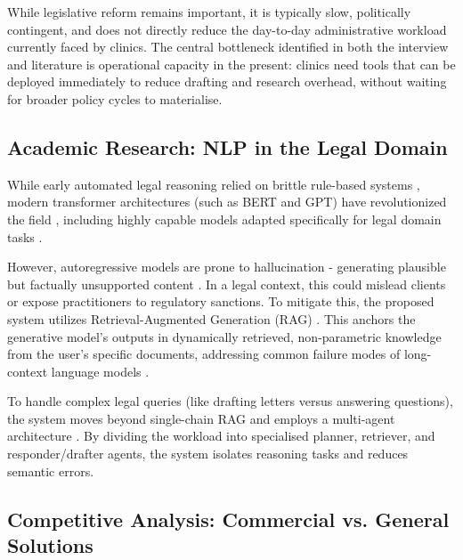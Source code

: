 \documentclass[11pt,a4paper]{article}
\begin{document}
While legislative reform remains important, it is typically slow, politically contingent, and does not directly reduce the day-to-day administrative workload currently faced by clinics. The central bottleneck identified in both the interview and literature is operational capacity in the present: clinics need tools that can be deployed immediately to reduce drafting and research overhead, without waiting for broader policy cycles to materialise.

\subsection{Academic Research: NLP in the Legal Domain}

While early automated legal reasoning relied on brittle rule-based systems \cite{mccarty1977}, modern transformer architectures (such as BERT and GPT) have revolutionized the field \cite{vaswani2017, devlin2019, brown2020}, including highly capable models adapted specifically for legal domain tasks \cite{chalkidis2020,lexglue2021,guha2023}.\par
However, autoregressive models are prone to hallucination - generating plausible but factually unsupported content \cite{maynez2020, ji2023}. In a legal context, this could mislead clients or expose practitioners to regulatory sanctions. To mitigate this, the proposed system utilizes Retrieval-Augmented Generation (RAG) \cite{lewis2020}. This anchors the generative model's outputs in dynamically retrieved, non-parametric knowledge from the user's specific documents, addressing common failure modes of long-context language models \cite{liu2023}.\par
To handle complex legal queries (like drafting letters versus answering questions), the system moves beyond single-chain RAG and employs a multi-agent architecture \cite{wu2023}. By dividing the workload into specialised planner, retriever, and responder/drafter agents, the system isolates reasoning tasks and reduces semantic errors.

\subsection{Competitive Analysis: Commercial vs. General Solutions}
\end{document}
